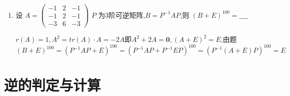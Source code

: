 \documentclass[12pt, a4paper, oneside, UTF8]{ctexbook}
\begin{document}
\begin{enumerate}[label=\arabic*.]
    \item 设
    $A = \begin{pmatrix}
    -1 & 2 & -1 \\
    -1 & 2 & -1 \\
    -3 & 6 & -3
    \end{pmatrix}$
    $ P $ 为3阶可逆矩阵,$ B = P^{-1}AP $,则 $ (B + E)^{100} =\_\_\_\_ $ 
    
    \begin{solution}
    $r(A)=1, A^2=tr(A)\cdot A=-2A$即$A^2+2A=\mathbf{0}, (A+E)^2=E$,由题 \\
    $(B+E)^{100}=(P^{-1}AP+E)^{100}=(P^{-1}AP+P^{-1}EP)^{100}=(P^{-1}(A+E)P)^{100}=E$
    \end{solution}
\end{enumerate}

\section{逆的判定与计算}
\end{document}
